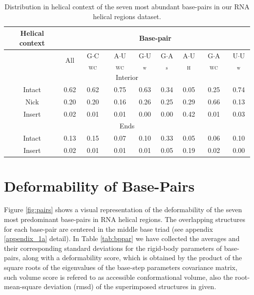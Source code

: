 \begin{table}[htbp]
\begin{center}
\begin{tabular}{|c|c|c|c|c|c|c|c|c|}
\hline
Helical context & \multicolumn{8}{c|}{Base-pair} \\
\hline
 & All & G$\cdot$C$_{\text{WC}}$ & A$\cdot$U$_{\text{WC}}$ &
G$\cdot$U$_{\text{w}}$ & G$\cdot$A$_{\text{s}}$ &
A$\cdot$U$_{\text{H}}$ & G$\cdot$A$_{\text{WC}}$ &
U$\cdot$U$_{\text{w}}$  \\
\hline
\multicolumn{9}{|c|}{Interior} \\
\hline
Intact &  0.62 & 0.62 & 0.75 & 0.63 & 0.34 & 0.05 & 0.25 & 0.74 \\
Nick   &  0.20 & 0.20 & 0.16 & 0.26 & 0.25 & 0.29 & 0.66 & 0.13 \\
Insert &  0.02 & 0.01 & 0.01 & 0.00 & 0.00 & 0.42 & 0.01 & 0.03 \\
\hline
\multicolumn{9}{|c|}{Ends} \\
\hline
Intact &  0.13 & 0.15 & 0.07 & 0.10 & 0.33 & 0.05 & 0.06 & 0.10 \\
Insert &  0.02 & 0.01 & 0.01 & 0.01 & 0.05 & 0.19 & 0.02 & 0.00 \\
\hline
\end{tabular}
\caption{Distribution in helical context of the seven most abundant
  base-pairs in our RNA helical regions dataset.}
\label{tab:helcontext}
\end{center}
\end{table}

\section{Deformability of Base-Pairs}
Figure   \ref{fig:pairs}  shows   a  visual   representation   of  the
deformability of the seven  most predominant base-pairs in RNA helical
regions. The overlapping structures for each base-pair are centered in
the  middle base  triad  (see appendix  \ref{appendix_1a} detail).  In
Table  \ref{tab:bppar}  we  have  collected  the  averages  and  their
corresponding  standard deviations  for the  rigid-body  parameters of
base-pairs, along with a
deformability score,  which is obtained  by the product of  the square
roots  of  the  eigenvalues  of the  base-step  parameters  covariance
matrix, such  volume score is  refered to as  accessible conformational
volume, also the root-mean-square deviation (rmsd) of the superimposed
structures in given.

